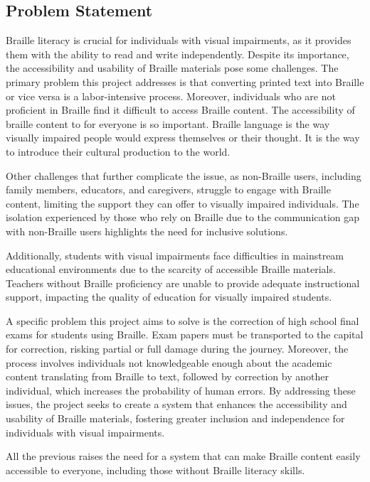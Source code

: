 \subsection{Problem Statement}


Braille literacy is crucial for individuals with visual impairments, as it provides them with the ability to read and write independently. Despite its importance, the accessibility and usability of Braille materials pose some challenges. The primary problem this project addresses is that converting printed text into Braille or vice versa is a labor-intensive process. Moreover, individuals who are not proficient in Braille find it difficult to access Braille content. The accessibility of braille content to for everyone is so important. Braille language is the way visually impaired people would express themselves or their thought. It is the way to introduce their cultural production to the world.


Other challenges that further complicate the issue, as non-Braille users, including family members, educators, and caregivers, struggle to engage with Braille content, limiting the support they can offer to visually impaired individuals. The isolation experienced by those who rely on Braille due to the communication gap with non-Braille users highlights the need for inclusive solutions.

Additionally, students with visual impairments face difficulties in mainstream educational environments due to the scarcity of accessible Braille materials. Teachers without Braille proficiency are unable to provide adequate instructional support, impacting the quality of education for visually impaired students. 

A specific problem this project aims to solve is the correction of high school final exams for students using Braille. Exam papers must be transported to the capital for correction, risking partial or full damage during the journey. Moreover, the process involves individuals not knowledgeable enough about the academic content translating from Braille to text, followed by correction by another individual, which increases the probability of human errors. By addressing these issues, the project seeks to create a system that enhances the accessibility and usability of Braille materials, fostering greater inclusion and independence for individuals with visual impairments.

All the previous raises the need for a system that can make Braille content easily accessible to everyone, including those without Braille literacy skills.


